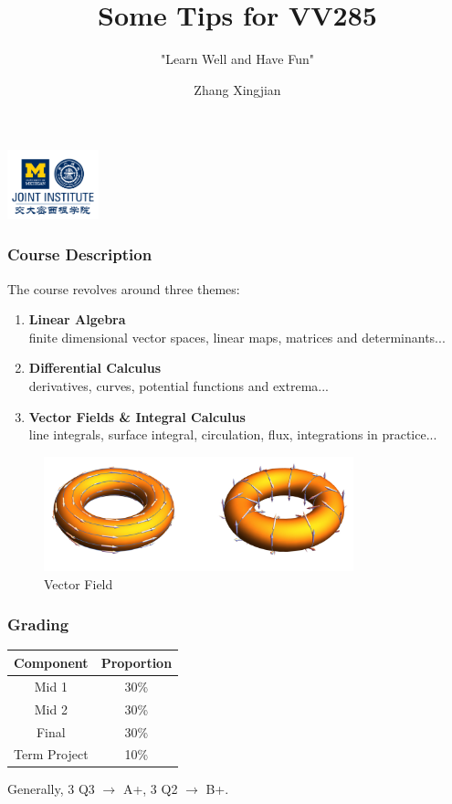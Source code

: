 \documentclass[UTF8]{beamer}
\title{Some Tips for \textbf{VV285}}
\subtitle{"Learn Well and Have Fun"}
\institute[UM-SJTU JI]{Univerity of Michigan-Shanghai Jiao Tong University Joint Institute}
\author{Zhang Xingjian}
\begin{document}
\begin{frame}
    \titlepage
    \begin{center}
        \includegraphics[height=2cm]{logo2.png}
    \end{center}
\end{frame}

\begin{frame}
    \frametitle{Course Description}
    The course revolves around three themes:
    \begin{enumerate}
        \item \textbf{Linear Algebra}\\
              finite dimensional vector spaces, linear maps, matrices and determinants...
        \item \textbf{Differential Calculus}\\
              derivatives, curves, potential functions and extrema...
        \item \textbf{Vector Fields \& Integral Calculus}\\
              line integrals, surface integral, circulation, flux, integrations in practice...
    \end{enumerate}
    \begin{figure}[H]
    \centering
    \includegraphics[width=0.8\textwidth]{2020-05-05-17-54-53.png}
    \caption{Vector Field}
    \end{figure}
    
\end{frame}

\begin{frame}
    \frametitle{Grading}
    \begin{table}[ht]
        \begin{tabular}{cc}
            \hline
            Component    & Proportion \\ \hline
            Mid 1        & 30\%       \\
            Mid 2        & 30\%       \\
            Final        & 30\%       \\
            Term Project & 10\%       \\ \hline
        \end{tabular}
    \end{table}
    Generally, 3 Q3 $\rightarrow$ A+, 3 Q2 $\rightarrow$ B+.
\end{frame}
\end{document}

